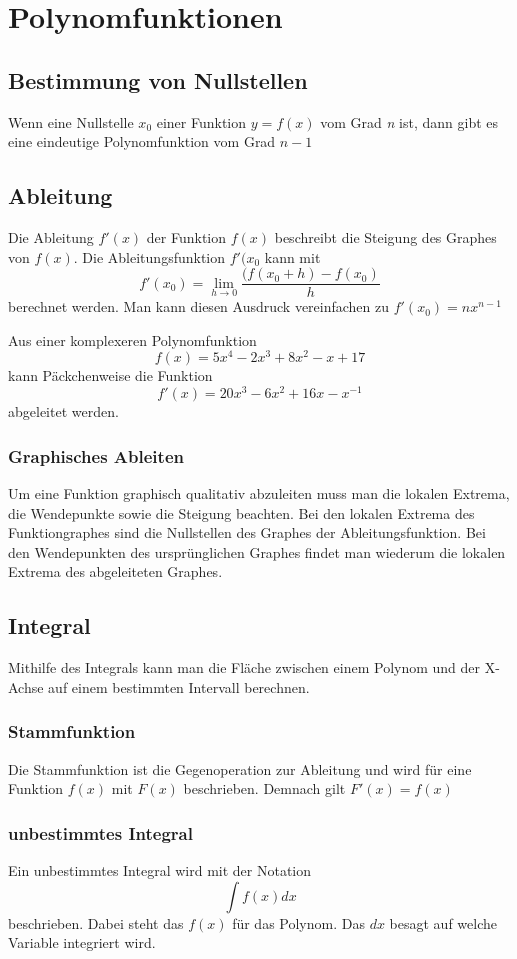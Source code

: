 \documentclass{article}
\author{Philipp Kiss}
\begin{document}

\section{Polynomfunktionen}
\subsection{Bestimmung von Nullstellen}
Wenn eine Nullstelle \(x_0\) einer Funktion \(y = f(x)\) vom Grad \textit{n} ist, dann gibt es eine eindeutige Polynomfunktion vom Grad \(n-1\)
\subsection{Ableitung}
Die Ableitung \(f'(x)\) der Funktion \(f(x)\) beschreibt die Steigung des Graphes von \(f(x)\). Die Ableitungsfunktion \(f'(x_0\) kann mit \[f'(x_0)= \lim_{h \to 0} \frac{(f(x_0 + h) - f(x_0)}{h} \]
berechnet werden. Man kann diesen Ausdruck vereinfachen zu \(f'(x_0) = nx^{n-1}\)

Aus einer komplexeren Polynomfunktion \[
		f(x) = 5x^4-2x^3+8x^2-x+17
\]
kann Päckchenweise die Funktion \[
		f'(x) = 20x^3-6x^2+16x-x^{-1}
\] abgeleitet werden.
\subsubsection{Graphisches Ableiten}
Um eine Funktion graphisch qualitativ abzuleiten muss man die lokalen Extrema, die Wendepunkte sowie die Steigung beachten. Bei den lokalen Extrema des Funktiongraphes sind die Nullstellen des Graphes der Ableitungsfunktion. Bei den Wendepunkten des ursprünglichen Graphes findet man wiederum die lokalen Extrema des abgeleiteten Graphes.
\subsection{Integral}
Mithilfe des Integrals kann man die Fläche zwischen einem Polynom und der X-Achse auf einem bestimmten Intervall berechnen.
\subsubsection{Stammfunktion}
Die Stammfunktion ist die Gegenoperation zur Ableitung und wird für eine Funktion \(f(x)\) mit \(F(x)\) beschrieben. Demnach gilt \(F'(x) = f(x)\)
\subsubsection{unbestimmtes Integral}
Ein unbestimmtes Integral wird mit der Notation
\[
		\int f(x)dx
\]
beschrieben. Dabei steht das \(f(x)\) für das Polynom. Das \(dx\) besagt auf welche Variable integriert wird.
\end{document}
